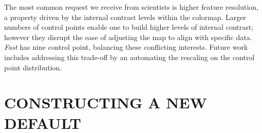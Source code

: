 \documentclass{IEEEcsmag}
\newcommand*{\colormap}[1]{\textsl{#1}\xspace}
\newcommand*{\huewheel}{\colormap{Hue Wheel}}
\newcommand*{\fast}{\colormap{Fast}}
\begin{document}

The most common request we receive from scientists is higher feature resolution, a property driven by the internal contrast levels within the colormap.
Larger numbers of control points enable one to build higher levels of internal contrast; however they disrupt the ease of adjusting the map to align with specific data.
\fast has nine control point, balancing these conflicting interests.
Future work includes addressing this trade-off by an automating the rescaling on the control point distribution.



\section{CONSTRUCTING A NEW DEFAULT}
\end{document}
